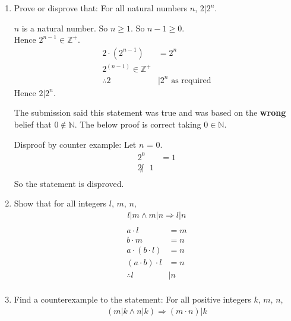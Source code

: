 \documentclass[10pt,\jkfside,a4paper]{article}
\begin{document}
\begin{enumerate}
\item Prove or disprove that: For all natural numbers $n$, $2|2^n$.

$n$ is a natural number. So $n \geqslant 1$. So $n - 1 \geqslant 0$.\\
Hence $2^{n - 1} \in \mathbb{Z}^+$.\\
\begin{equation}
\begin{split}
2 \cdot (2^{n - 1}) &= 2^n\\
2^{(n-1)} \in \mathbb{Z}^+\\
\therefore 2&|2^n\text{ as required}
\end{split}
\end{equation}
Hence $2|2^n$.

The submission said this statement was true and was based on the \textbf{wrong} 
belief that $0 \not\in \mathbb{N}$. The below proof is correct taking $0\in \mathbb{N}$.

Disproof by counter example: Let $n$ = 0.
\begin{equation}
\begin{split}
2^0 &= 1\\
2 \not| \text{ } 1\\
\end{split}
\end{equation}
So the statement is disproved.

\item Show that for all integers $l$, $m$, $n$,
\begin{equation}
\begin{split}
l|m \wedge m|n \Longrightarrow l|n\\
\end{split}
\end{equation}
\begin{equation}
\begin{split}
a\cdot l &= m\\
b\cdot m &= n\\
a\cdot (b \cdot l) &= n\\
(a\cdot b)\cdot l &= n\\
\therefore l &| n\\
\end{split}
\end{equation}

\item Find a counterexample to the statement: For all positive integers $k$, $m$, $n$, 
\begin{equation}
\begin{split}
(m|k \wedge n|k) \Longrightarrow (m\cdot n)|k\\
\end{split}
\end{equation}


\end{enumerate}
\end{document}
